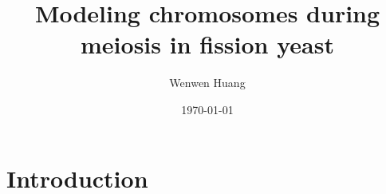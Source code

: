\documentclass{article}
\begin{document}
\title{Modeling chromosomes during meiosis in fission yeast}
\author{Wenwen Huang}
\date{\today}

\maketitle

\section{Introduction}
\label{sec:introduction}
\end{document}
